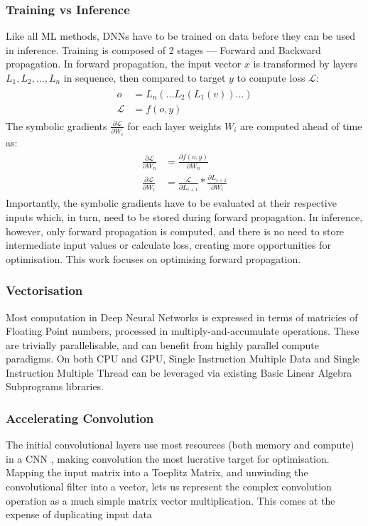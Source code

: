 \documentclass[12pt]{article}
\newcommand{\Loss}{\mathcal{L}}
\begin{document}
\subsubsection{Training vs Inference}
Like all ML methods, DNNs have to be trained on data before they can be used in inference. Training
is composed of 2 stages --- Forward and Backward propagation.
In forward propagation, the input vector $x$ is transformed by layers $L_1, L_2,..., L_n$
in sequence,
then compared to target $y$ to compute loss $\Loss$:
\begin{gather}
\begin{split}
    o &= L_n( ... L_2(L_1(v)) ... )\\
    \Loss &= f(o, y)
\end{split}
\end{gather}
The symbolic gradients $\frac{\partial \Loss}{\partial W_i}$ for each layer weights $W_i$
are computed ahead of time as:
\begin{gather}
\begin{split}
    \frac{\partial \Loss}{\partial W_n} &= \frac{\partial f(o, y)}{\partial W_n}\\
    \frac{\partial \Loss}{\partial W_i} &= \frac{\Loss}{\partial L_{i+1}} * \frac{\partial
    L_{i+1}}{\partial W_i}
\end{split}
\end{gather}
Importantly, the symbolic gradients have to be evaluated at their respective inputs which,
in turn, need to be stored during forward propagation.
In inference, however, only forward propagation is computed, and there is no need to store
intermediate input values or calculate loss, creating more opportunities for optimisation.
This work focuses on optimising forward propagation.


\subsubsection{Vectorisation}
Most computation in Deep Neural Networks is expressed in terms of matricies of Floating Point
numbers, processed in multiply-and-accumulate operations.
These are trivially parallelisable, and can benefit from highly parallel compute
paradigms\cite{sze2017efficient}.
On both CPU and GPU, Single Instruction Multiple Data and Single Instruction Multiple Thread
can be leveraged via existing Basic Linear Algebra Subprograms libraries.

\subsubsection{Accelerating Convolution}
The initial convolutional layers use most resources (both memory and compute) in a CNN
\cite{karpathy2015cs231n},
making convolution the most lucrative target for optimisation.
Mapping the input matrix into a Toeplitz Matrix, and unwinding the convolutional filter into
a vector,
lets us represent the complex convolution operation as a much simple matrix vector
multiplication. This
comes at the expense of duplicating input data \cite{sze2017efficient}
\end{document}
